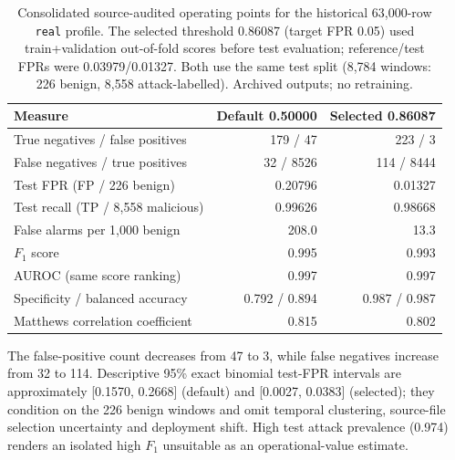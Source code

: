 \documentclass[12pt,a4paper]{article}
\begin{document}
\begin{table}[tbp]\centering\small
\caption{Consolidated source-audited operating points for the historical 63,000-row \texttt{real} profile. The selected threshold 0.86087 (target FPR 0.05) used train+validation out-of-fold scores before test evaluation; reference/test FPRs were 0.03979/0.01327. Both use the same test split (8,784 windows: 226 benign, 8,558 attack-labelled). Archived outputs; no retraining.}\label{tab:stage6_confusion}
\setlength{\tabcolsep}{4pt}
\begin{tabularx}{\linewidth}{@{}>{\raggedright\arraybackslash}Xrr@{}}\toprule
Measure & Default 0.50000 & Selected 0.86087 \\\midrule
True negatives / false positives & 179 / 47 & 223 / 3 \\
False negatives / true positives & 32 / 8526 & 114 / 8444 \\
Test FPR (FP / 226 benign) & 0.20796 & 0.01327 \\
Test recall (TP / 8,558 malicious) & 0.99626 & 0.98668 \\
False alarms per 1,000 benign & 208.0 & 13.3 \\
$F_1$ score & 0.995 & 0.993 \\
AUROC (same score ranking) & 0.997 & 0.997 \\
Specificity / balanced accuracy & 0.792 / 0.894 & 0.987 / 0.987 \\
Matthews correlation coefficient & 0.815 & 0.802 \\
\bottomrule\end{tabularx}
\end{table}
The false-positive count decreases from 47 to 3, while false negatives increase from 32 to 114. Descriptive 95\% exact binomial test-FPR intervals are approximately [0.1570, 0.2668] (default) and [0.0027, 0.0383] (selected); they condition on the 226 benign windows and omit temporal clustering, source-file selection uncertainty and deployment shift. High test attack prevalence (0.974) renders an isolated high $F_1$ unsuitable as an operational-value estimate.
\end{document}
